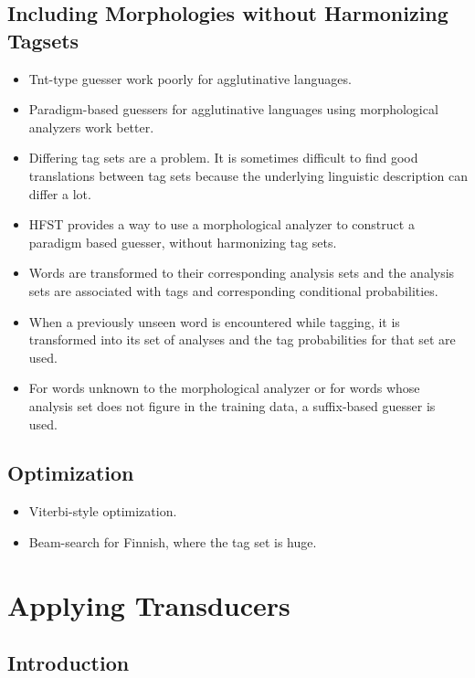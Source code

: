 \documentclass{llncs}
\begin{document}
\subsection{Including Morphologies without Harmonizing Tagsets}

\begin{itemize}
\item Tnt-type guesser work poorly for agglutinative languages.
\item Paradigm-based guessers for agglutinative languages using
  morphological analyzers work better.
\item Differing tag sets are a problem. It is sometimes difficult to
  find good translations between tag sets because the underlying
  linguistic description can differ a lot.
\item HFST provides a way to use a morphological analyzer to construct
  a paradigm based guesser, without harmonizing tag sets.
\item Words are transformed to their corresponding analysis sets and
  the analysis sets are associated with tags and corresponding
  conditional probabilities.
\item When a previously unseen word is encountered while tagging, it
  is transformed into its set of analyses and the tag probabilities
  for that set are used.
\item For words unknown to the morphological analyzer or for words
  whose analysis set does not figure in the training data, a
  suffix-based guesser is used.
\end{itemize}

\subsection{Optimization}
\begin{itemize}
\item Viterbi-style optimization.
\item Beam-search for Finnish, where the tag set is huge.
\end{itemize}

\section{Applying Transducers}

\subsection{Introduction}
\end{document}
